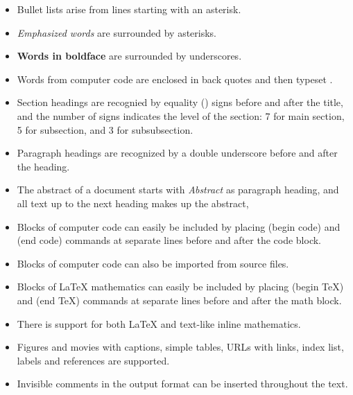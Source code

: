 \documentclass[twoside]{book}
\begin{document}
\begin{itemize}
  \item Bullet lists arise from lines starting with an asterisk.

  \item \emph{Emphasized words} are surrounded by asterisks.

  \item \textbf{Words in boldface} are surrounded by underscores.

  \item Words from computer code are enclosed in back quotes and
    then typeset .

  \item Section headings are recognied by equality (\code{=}) signs before
    and after the title, and the number of \code{=} signs indicates the
    level of the section: 7 for main section, 5 for subsection, and
    3 for subsubsection.

  \item Paragraph headings are recognized by a double underscore
    before and after the heading.

  \item The abstract of a document starts with \emph{Abstract} as paragraph
    heading, and all text up to the next heading makes up the abstract,

  \item Blocks of computer code can easily be included by placing
     (begin code) and  (end code) commands at separate lines
    before and after the code block.

  \item Blocks of computer code can also be imported from source files.

  \item Blocks of {\LaTeX} mathematics can easily be included by placing
     (begin TeX) and  (end TeX) commands at separate lines
    before and after the math block.

  \item There is support for both {\LaTeX} and text-like inline mathematics.

  \item Figures and movies with captions, simple tables,
    URLs with links, index list, labels and references are supported.

  \item Invisible comments in the output format can be inserted throughout
    the text.


\end{itemize}
\end{document}

